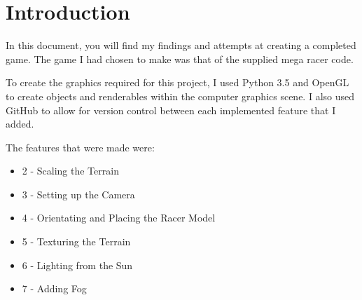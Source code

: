 \documentclass[11pt, oneside, a4paper]{article}
\begin{document}


\pagestyle{fancy}
\fancyhf{}


\newpage
\tableofcontents

\listoffigures

\newpage


\section{Introduction}
In this document, you will find my findings and attempts at creating a completed game. The game I had chosen to make was that of the supplied mega racer code.

To create the graphics required for this project, I used Python 3.5 and OpenGL to create objects and renderables within the computer graphics scene. I also used GitHub to allow for version control between each implemented feature that I added.

The features that were made were:
\begin{itemize}
	\item{2 - Scaling the Terrain}
	\item{3 - Setting up the Camera}
	\item{4 - Orientating and Placing the Racer Model}
	\item{5 - Texturing the Terrain}
	\item{6 - Lighting from the Sun}
	\item{7 - Adding Fog}
\end{itemize}
\end{document}
